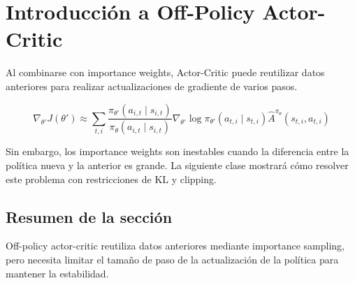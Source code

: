 \section{Introducción a Off-Policy Actor-Critic}

Al combinarse con importance weights, Actor-Critic puede reutilizar datos anteriores para realizar actualizaciones de gradiente de varios pasos.

$$\nabla_{\theta'} J(\theta') \approx \sum_{t,i} \frac{\pi_{\theta'}(a_{i,t} \mid s_{i,t})}{\pi_\theta(a_{i,t} \mid s_{i,t})} \nabla_{\theta'} \log \pi_{\theta'}(a_{t,i} \mid s_{t,i}) \hat{A}^{\pi_\theta}(s_{t,i}, a_{t,i})$$

Sin embargo, los importance weights son inestables cuando la diferencia entre la política nueva y la anterior es grande. La siguiente clase mostrará cómo resolver este problema con restricciones de KL y clipping.

\subsection{Resumen de la sección}

Off-policy actor-critic reutiliza datos anteriores mediante importance sampling, pero necesita limitar el tamaño de paso de la actualización de la política para mantener la estabilidad.

